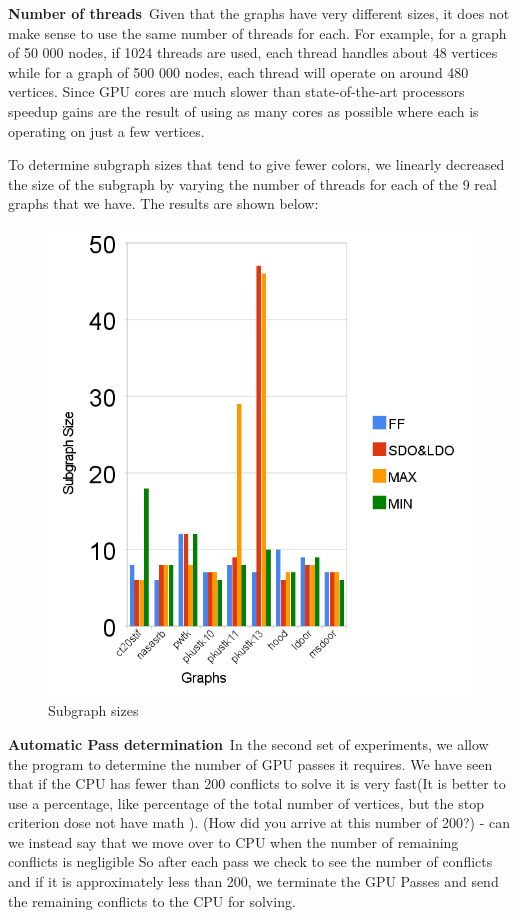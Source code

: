 \documentclass[preprint]{sigplanconf}
\begin{document}
\textbf{Number of threads}\
Given that the graphs have very different sizes, it does not make sense to use the same number of threads for each. For example, for a graph of 50 000 nodes, if 1024 threads are used, each thread handles about 48 vertices while for a graph of 500 000 nodes, each thread will operate on around 480 vertices. Since GPU cores are much slower than state-of-the-art processors speedup gains are the result of using as many cores as possible where each is operating on just a few vertices.

To determine subgraph sizes that tend to give fewer colors, we linearly decreased the size of the subgraph by varying the number of threads for each of the 9 real graphs that we have. The results are shown below:

\begin{figure}
  \centering
  \includegraphics[scale=0.5]{figures/subgraphSize.png}
  \caption{ Subgraph sizes }
\end{figure}


\textbf{Automatic Pass determination}\
In the second set of experiments, we allow the program to determine the number of GPU passes it requires. We have seen that if the CPU has fewer than 200 conflicts to solve it is very fast(It is better to use a percentage, like percentage of the total number of vertices, but the stop criterion dose not have math ). (How did you arrive at this number of 200?)  - can we instead say that we move over to CPU when the number of remaining conflicts is negligible So after each pass we check to see the number of conflicts and if it is approximately less than 200, we terminate the GPU Passes and send the remaining conflicts to the CPU for solving.\
\end{document}
